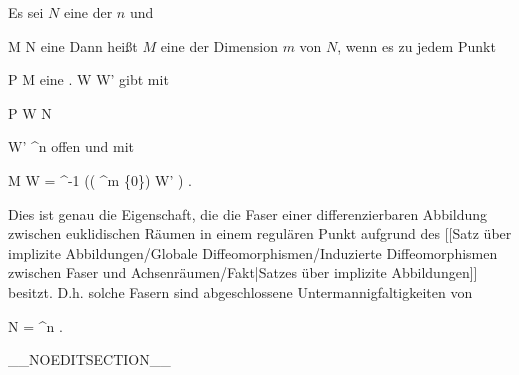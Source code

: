 \setcounter{section}{10}


{}
{

Es sei $N$ eine
der
$n$ und

\mavergleichskette
{\vergleichskette
{ M
}
{ \subseteq }{ N
}
{  }{
}
{    }{
}
{   }{
}
}
{}{}{}
eine
Dann heißt $M$ eine  der Dimension $m$ von $N$, wenn es zu jedem Punkt

\mavergleichskette
{\vergleichskette
{ P
}
{ \in }{ M
}
{  }{
}
{    }{
}
{   }{
}
}
{}{}{}
eine
 {.} {}
\maabbdisp {\theta} { W } { W'
} {}
gibt mit

\mavergleichskette
{\vergleichskette
{ P
}
{ \in }{ W
}
{ \subseteq }{ N
}
{    }{
}
{   }{
}
}
{}{}{}

\mavergleichskette
{\vergleichskette
{ W'
}
{ \subseteq }{ \R^n
}
{  }{
}
{    }{
}
{   }{
}
}
{}{}{}
offen und mit

\mavergleichskettedisp
{\vergleichskette
{ M \cap W
}
{ =} { \theta^{-1} (( \R^m  \times\{0\}) \cap W' )
}
{ } {
}
{ } {
}
{ } {
}
}
{}{}{.}

}

Dies ist genau die Eigenschaft, die die Faser einer differenzierbaren Abbildung zwischen euklidischen Räumen in einem regulären Punkt
aufgrund des [[Satz über implizite Abbildungen/Globale Diffeomorphismen/Induzierte Diffeomorphismen zwischen Faser und Achsenräumen/Fakt|Satzes über implizite Abbildungen]]
besitzt. D.h. solche Fasern sind abgeschlossene Untermannigfaltigkeiten von

\mavergleichskette
{\vergleichskette
{ N
}
{ = }{ \R^n
}
{  }{
}
{    }{
}
{   }{
}
}
{}{}{.}

__NOEDITSECTION__

